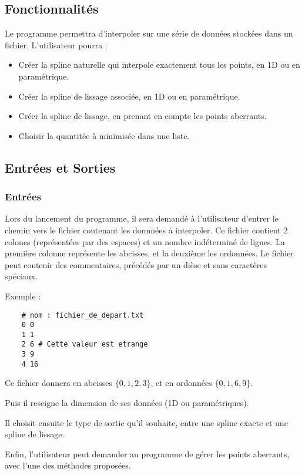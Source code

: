 \documentclass[a4paper,12pt]{article}
\begin{document}
\subsection{Fonctionnalités}
\label{Fonctions}

Le programme permettra d'interpoler sur une série de données stockées dans un fichier. L'utilisateur pourra :
\begin{itemize}
\item Créer la spline naturelle qui interpole exactement tous les points, en 1D ou en paramétrique.
\item Créer la spline de lissage associée, en  1D ou en paramétrique.
\item Créer la spline de lissage, en prenant en compte les points aberrants.
\item Choisir la quantitée à minimisée dans une liste.
\end{itemize}

\subsection{Entrées et Sorties}

\subsubsection{Entrées}

Lors du lancement du programme, il sera demandé à l'utilisateur d'entrer le chemin vers le fichier contenant les donnnées à interpoler.
Ce fichier contient 2 colones (représentées par des espaces) et un nombre indéterminé de lignes. La première colonne représente les abcisses, et la deuxième les ordonnées. Le fichier peut contenir des commentaires, précédés par un dièse et sans caractères spéciaux.

Exemple :

\begin{lstlisting}
    # nom : fichier_de_depart.txt
    0 0
    1 1
    2 6 # Cette valeur est etrange
    3 9
    4 16
\end{lstlisting}

Ce fichier donnera en abcisses  $\{0,1,2,3\}$, et en ordonnées $\{0,1,6,9\}$.

Puis il reseigne la dimension de ses données (1D ou paramétriques).

Il choisit ensuite le type de sortie qu'il souhaite, entre une spline exacte et une spline de lissage.

Enfin, l'utilisateur peut demander au programme de gérer les points aberrants, avec l'une des méthodes proposées.
\end{document}
